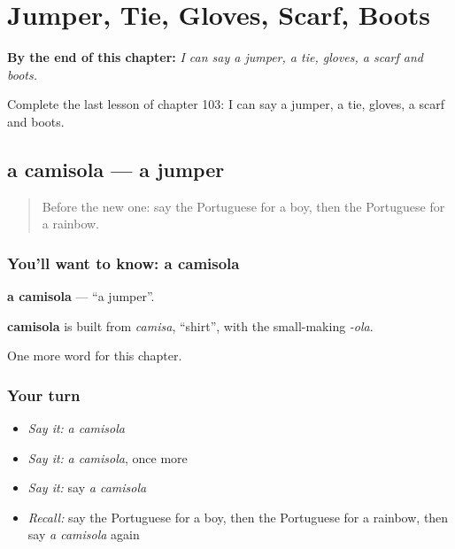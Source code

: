
\chapter{Jumper, Tie, Gloves, Scarf, Boots}
\label{ch:pt-jumper-tie-gloves-scarf-boots}

\begin{chapteropening}
\textbf{By the end of this chapter:} \emph{I can say a jumper, a tie, gloves, a scarf and boots.}

Complete the last lesson of chapter 103: I can say a jumper, a tie, gloves, a scarf and boots.
\end{chapteropening}

\section[a camisola]{a camisola — a jumper}

\label{lesson:PT-C103-camisola}



\begin{quote}
Before the new one: say the Portuguese for a boy, then the Portuguese for a rainbow.
\end{quote}

\subsection*{You'll want to know: a camisola}
\textbf{a camisola} — \textquotedblleft{}a jumper\textquotedblright{}.

\begin{cousinweb}
\textbf{camisola} is built from \emph{camisa}, \textquotedblleft{}shirt\textquotedblright{}, with the small-making \emph{-ola}.
\end{cousinweb}

\begin{grammarlens}[title={What you've built}]
One more word for this chapter.
\end{grammarlens}

\subsection*{Your turn}
\begin{itemize}
\raggedright
  \item \emph{Say it:} \emph{a camisola}
  \item \emph{Say it:} \emph{a camisola}, once more
  \item \emph{Say it:} say \emph{a camisola}
  \item \emph{Recall:} say the Portuguese for a boy, then the Portuguese for a rainbow, then say \emph{a camisola} again
\end{itemize}

